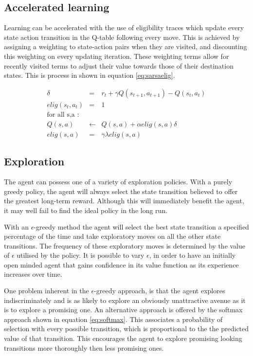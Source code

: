 \documentclass{rucsthesis}
\begin{document}
\subsection{Accelerated learning}

Learning can be accelerated with the use of eligibility traces which update every state action transition in the Q-table following every move. This is achieved by assigning a weighting to state-action pairs when they are visited, and discounting this weighting on every updating iteration. These weighting terms allow for recently visited terms to adjust their value towards those of their destination states. This is process in shown in equation \ref{eq:sarsaelig}.

\begin{eqnarray*}
\delta & = & r_{t} + \gamma Q(s_{t+1},a_{t+1}) - Q(s_t,a_t) \\
elig(s_t,a_t) & = & 1 \\
 \textrm{for all s,a : } & &  \\
Q(s,a) & \leftarrow & Q(s,a) + \alpha elig(s,a) \delta \label{eq:sarsaelig} \\
elig(s,a) & = & \gamma \lambda elig(s,a)
\end{eqnarray*}

\subsection{Exploration}

The agent can possess one of a variety of exploration policies. With a purely greedy policy, the agent will always select the state transition believed to offer the greatest long-term reward. Although this will immediately benefit the agent, it may well fail to find the ideal policy in the long run. 

With an $\epsilon$-greedy method the agent will select the best state transition a specified percentage of the time and take exploratory moves on all the other state transitions. The frequency of these exploratory moves is determined by the value of $\epsilon$ utilised by the policy. It is possible to vary $\epsilon$, in order to have an initially open minded agent that gains confidence in its value function as its experience increases over time. 

One problem inherent in the $\epsilon$-greedy approach, is that the agent explores indiscriminately and is as likely to explore an obviously unattractive avenue as it is to explore a promising one. An alternative approach is offered by the softmax approach shown in equation \ref{eq:softmax}. This associates a probability of selection with every possible transition, which is proportional to the the predicted value of that transition. This encourages the agent to explore promising looking transitions more thoroughly then less promising ones.
\end{document}
